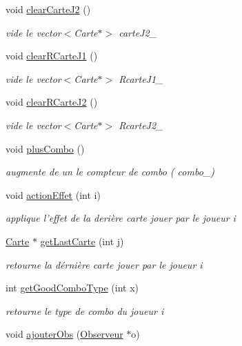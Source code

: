 \begin{DoxyCompactItemize}
void \hyperlink{class_jeu_ae62fc97f873d2c033b0b647db617f8f4}{clear\-Carte\-J2} ()
\begin{DoxyCompactList}\small\item\em vide le vector$<$\-Carte$\ast$$>$ carte\-J2\-\_\- \end{DoxyCompactList}\item 
void \hyperlink{class_jeu_a890ea4e42ea493a8179fdfb94b6c2fac}{clear\-R\-Carte\-J1} ()
\begin{DoxyCompactList}\small\item\em vide le vector$<$\-Carte$\ast$$>$ Rcarte\-J1\-\_\- \end{DoxyCompactList}\item 
void \hyperlink{class_jeu_ad41dfbbdde90ba9579173af18ea2a670}{clear\-R\-Carte\-J2} ()
\begin{DoxyCompactList}\small\item\em vide le vector$<$\-Carte$\ast$$>$ Rcarte\-J2\-\_\- \end{DoxyCompactList}\item 
void \hyperlink{class_jeu_a5a74a90faa114fd22a09ed25b9fc8381}{plus\-Combo} ()
\begin{DoxyCompactList}\small\item\em augmente de un le compteur de combo ( combo\-\_\-) \end{DoxyCompactList}\item 
void \hyperlink{class_jeu_af3b060e950164595e1e75901c7c701ad}{action\-Effet} (int i)
\begin{DoxyCompactList}\small\item\em applique l'effet de la derière carte jouer par le joueur i \end{DoxyCompactList}\item 
\hyperlink{class_carte}{Carte} $\ast$ \hyperlink{class_jeu_a71d1539ad625597004b324e15fc9bf7f}{get\-Last\-Carte} (int j)
\begin{DoxyCompactList}\small\item\em retourne la dérnière carte jouer par le joueur i \end{DoxyCompactList}\item 
int \hyperlink{class_jeu_a2b0a504e0fc5a6e5a74f362ab26d9633}{get\-Good\-Combo\-Type} (int x)
\begin{DoxyCompactList}\small\item\em retourne le type de combo du joueur i \end{DoxyCompactList}\item 
void \hyperlink{class_jeu_aee83ada0589e3352ec854b12e1c6e265}{ajouter\-Obs} (\hyperlink{class_observeur}{Observeur} $\ast$o)

\end{DoxyCompactItemize}
